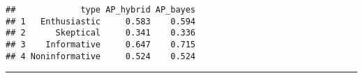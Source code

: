 \documentclass[
]{book}
\begin{document}
\begin{verbatim}
##             type AP_hybrid AP_bayes
## 1   Enthusiastic     0.583    0.594
## 2      Skeptical     0.341    0.336
## 3    Informative     0.647    0.715
## 4 Noninformative     0.524    0.524
\end{verbatim}

\begin{center}\rule{0.5\linewidth}{0.5pt}\end{center}

  
\end{document}
